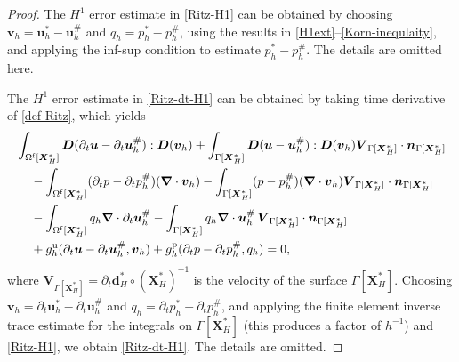 \documentclass[11pt,reqno]{amsart}
\theoremstyle{definition}
\theoremstyle{plain}
\numberwithin{theorem}{section}
\numberwithin{proposition}{section}
\numberwithin{lemma}{section}
\numberwithin{equation}{section}
\newcommand{\bs}[1]{\boldsymbol{#1}}
\newcommand{\uu}[1]  {{\bs{#1}} }
\newcommand{\grad}   { \uu{\nabla}    }
\newcommand{\bv}{{\bs v}}
\renewcommand{\(}{\bigl(}
\renewcommand{\)}{\bigr)}
\begin{document}
\begin{proof}
The $H^1$ error estimate in \eqref{Ritz-H1} can be obtained by choosing ${\bs v}_h={\bs u}_h^*-{\bs u}_h^\#$ and $q_h=p_h^*-p_h^\#$, using the results in \eqref{H1ext}--\eqref{Korn-inequlaity}, and applying the inf-sup condition to estimate $p_h^*-p_h^\#$. The details are omitted here.

The $H^1$ error estimate in \eqref{Ritz-dt-H1} can be obtained by taking time derivative of \eqref{def-Ritz}, which yields  
\begin{align}\label{dt-Ritz}
& \int_{\Omega^{\rm f}[\bs X_H^*]} \bs D(\partial_t{\bs u}-\partial_t{\bs u}_h^\#): \bs D(\bv_h) 
+ \int_{\Gamma[\bs X_H^*]} \bs D({\bs u}-{\bs u}_h^\#): \bs D(\bv_h) {\bs V}_{\Gamma[\bs X_H^*]}\cdot{\bs n}_{\Gamma[\bs X_H^*]} \notag\\
&\quad\, - \int_{\Omega^{\rm f}[\bs X_H^*]} ( \partial_tp - \partial_tp_h^\# ) (\grad\cdot\bv_h) 
- \int_{\Gamma[\bs X_H^*]} ( p - p_h^\# ) (\grad\cdot\bv_h) {\bs V}_{\Gamma[\bs X_H^*]}\cdot{\bs n}_{\Gamma[\bs X_H^*]} \notag\\
&\quad\, - \int_{\Omega^{\rm f}[\bs X_H^*]}  q_h \grad\cdot \partial_t{\bs u}_h^\# 
- \int_{\Gamma[\bs X_H^*]}  q_h \grad\cdot {\bs u}_h^\# \, {\bs V}_{\Gamma[\bs X_H^*]}\cdot{\bs n}_{\Gamma[\bs X_H^*]} \notag\\
&\quad\, + g_h^{\rm u} (\partial_t{\bs u}-\partial_t{\bs u}_h^\#,\bv_h ) + g_h^{\rm p} (\partial_tp - \partial_tp_h^\#,q_h ) = 0 ,
\end{align}
where ${\bs V}_{\Gamma[\bs X_H^*]}=\partial_t{\bs d}_H^*\circ({\bs X}_H^*)^{-1}$ is the velocity of the surface $\Gamma[\bs X_H^*]$. 
Choosing ${\bs v}_h=\partial_t{\bs u}_h^*-\partial_t{\bs u}_h^\#$ and $q_h=\partial_tp_h^*-\partial_tp_h^\#$, and applying the finite element inverse trace estimate for the integrals on $\Gamma[{\bs X}_H^*]$ (this produces a factor of $h^{-1}$) and \eqref{Ritz-H1}, we obtain  \eqref{Ritz-dt-H1}. The details are omitted. 


\end{proof}
\end{document}
